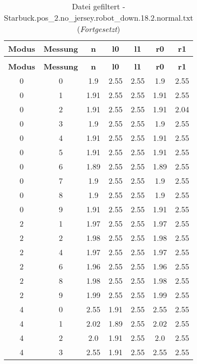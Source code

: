 \clearpage{}
\begin{longtable}{|c|c||c||c|c||c|c|}
	\caption{Datei gefiltert - Starbuck.pos\_2.no\_jersey.robot\_down.18.2.normal.txt} \label{tab:Starbuck.pos-2.no-jersey.robot-down.18.2.normal.txt} \\ \hline
	\textbf{Modus} & \textbf{Messung} & \textbf{n} & \textbf{l0} & \textbf{l1} & \textbf{r0} & \textbf{r1}\\ \hline
	\endfirsthead
	\caption[]{Datei gefiltert - Starbuck.pos\_2.no\_jersey.robot\_down.18.2.normal.txt (\emph{Fortgesetzt})} \\ \hline
	\textbf{Modus} & \textbf{Messung} & \textbf{n} & \textbf{l0} & \textbf{l1} & \textbf{r0} & \textbf{r1}\\ \hline
	\endhead
	0 & 0 & 1.9 & 2.55 & 2.55 & 1.9 & 2.55 \\ \hline
	0 & 1 & 1.91 & 2.55 & 2.55 & 1.91 & 2.55 \\ \hline
	0 & 2 & 1.91 & 2.55 & 2.55 & 1.91 & 2.04 \\ \hline
	0 & 3 & 1.9 & 2.55 & 2.55 & 1.9 & 2.55 \\ \hline
	0 & 4 & 1.91 & 2.55 & 2.55 & 1.91 & 2.55 \\ \hline
	0 & 5 & 1.91 & 2.55 & 2.55 & 1.91 & 2.55 \\ \hline
	0 & 6 & 1.89 & 2.55 & 2.55 & 1.89 & 2.55 \\ \hline
	0 & 7 & 1.9 & 2.55 & 2.55 & 1.9 & 2.55 \\ \hline
	0 & 8 & 1.9 & 2.55 & 2.55 & 1.9 & 2.55 \\ \hline
	0 & 9 & 1.91 & 2.55 & 2.55 & 1.91 & 2.55 \\ \hline
	2 & 1 & 1.97 & 2.55 & 2.55 & 1.97 & 2.55 \\ \hline
	2 & 2 & 1.98 & 2.55 & 2.55 & 1.98 & 2.55 \\ \hline
	2 & 4 & 1.97 & 2.55 & 2.55 & 1.97 & 2.55 \\ \hline
	2 & 6 & 1.96 & 2.55 & 2.55 & 1.96 & 2.55 \\ \hline
	2 & 8 & 1.98 & 2.55 & 2.55 & 1.98 & 2.55 \\ \hline
	2 & 9 & 1.99 & 2.55 & 2.55 & 1.99 & 2.55 \\ \hline
	4 & 0 & 2.55 & 1.91 & 2.55 & 2.55 & 2.55 \\ \hline
	4 & 1 & 2.02 & 1.89 & 2.55 & 2.02 & 2.55 \\ \hline
	4 & 2 & 2.0 & 1.91 & 2.55 & 2.0 & 2.55 \\ \hline
	4 & 3 & 2.55 & 1.91 & 2.55 & 2.55 & 2.55 \\ \hline

\end{longtable}
